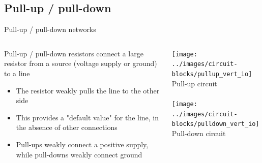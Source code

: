 \documentclass{beamer}
\begin{document}
\subsection{Pull-up / pull-down}
\begin{frame}{Pull-up / pull-down networks}
  \begin{columns}[T]
    \begin{column}{.6\textwidth}
	  Pull-up / pull-down resistors connect a large resistor from a source (voltage supply or ground) to a line
      \begin{itemize}
        \item The resistor weakly pulls the line to the other side
        \item This provides a "default value" for the line, in the absence of other connections
        \item Pull-ups weakly connect a positive supply, while pull-downs weakly connect ground
      \end{itemize}
    \end{column}

    \begin{column}{0.4\textwidth} \centering
      \texttt{[image: ../images/circuit-blocks/pullup\_vert\_io]} \\
      Pull-up circuit \\
      ~ \\
      \texttt{[image: ../images/circuit-blocks/pulldown\_vert\_io]} \\
      Pull-down circuit
    \end{column}
  \end{columns}
\end{frame}
\end{document}
